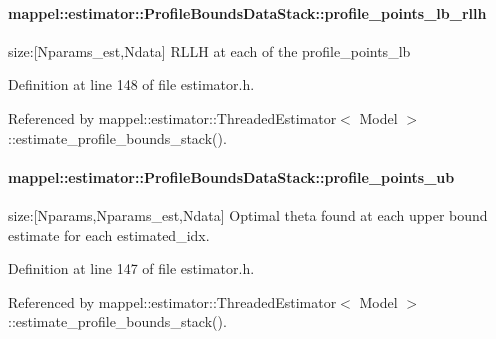 \paragraph[{\texorpdfstring{profile\+\_\+points\+\_\+lb\+\_\+rllh}{profile_points_lb_rllh}}]{ mappel\+::estimator\+::\+Profile\+Bounds\+Data\+Stack\+::profile\+\_\+points\+\_\+lb\+\_\+rllh}\hypertarget{structmappel_1_1estimator_1_1ProfileBoundsDataStack_a7d945ad7a7c73347babcde947b20515f}{}\label{structmappel_1_1estimator_1_1ProfileBoundsDataStack_a7d945ad7a7c73347babcde947b20515f}


size\+:\mbox{[}Nparams\+\_\+est,Ndata\mbox{]} R\+L\+LH at each of the profile\+\_\+points\+\_\+lb 



Definition at line 148 of file estimator.\+h.



Referenced by mappel\+::estimator\+::\+Threaded\+Estimator$<$ Model $>$\+::estimate\+\_\+profile\+\_\+bounds\+\_\+stack().

\paragraph[{\texorpdfstring{profile\+\_\+points\+\_\+ub}{profile_points_ub}}]{ mappel\+::estimator\+::\+Profile\+Bounds\+Data\+Stack\+::profile\+\_\+points\+\_\+ub}\hypertarget{structmappel_1_1estimator_1_1ProfileBoundsDataStack_a3839871c217f56c0d25a94a09130295d}{}\label{structmappel_1_1estimator_1_1ProfileBoundsDataStack_a3839871c217f56c0d25a94a09130295d}


size\+:\mbox{[}Nparams,Nparams\+\_\+est,Ndata\mbox{]} Optimal theta found at each upper bound estimate for each estimated\+\_\+idx. 



Definition at line 147 of file estimator.\+h.



Referenced by mappel\+::estimator\+::\+Threaded\+Estimator$<$ Model $>$\+::estimate\+\_\+profile\+\_\+bounds\+\_\+stack().

